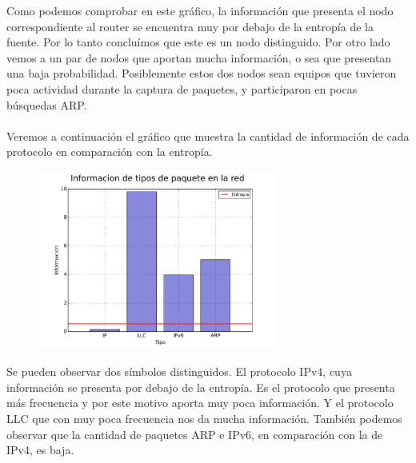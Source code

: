 \FloatBarrier

Como podemos comprobar en este gráfico, la información que presenta el nodo correspondiente al router se encuentra muy por debajo de la entropía de la fuente. Por lo tanto concluímos que este es un nodo distinguido. Por otro lado vemos a un par de nodos que aportan mucha información, o sea que presentan una baja probabilidad. Posiblemente estos dos nodos sean equipos que tuvieron poca actividad durante la captura de paquetes, y participaron en pocas búsquedas ARP.
\\\\
Veremos a continuación el gráfico que muestra la cantidad de información de cada protocolo en comparación con la entropía.

\FloatBarrier

\begin{figure}[ht!]
  \centering
   \includegraphics[width=0.7\textwidth]{graficos/laboral_information_bars_type.png}
  \caption{}
  \label{fig:laboral_information_bars_type}
\end{figure}

\FloatBarrier

Se pueden observar dos símbolos distinguidos. El protocolo IPv4, cuya información se presenta por debajo de la entropía. Es el protocolo que presenta más frecuencia y por este motivo aporta muy poca información.
Y el protocolo LLC que con muy poca frecuencia nos da mucha información.
También podemos observar que la cantidad de paquetes ARP e IPv6, en comparación con la de IPv4, es baja.
